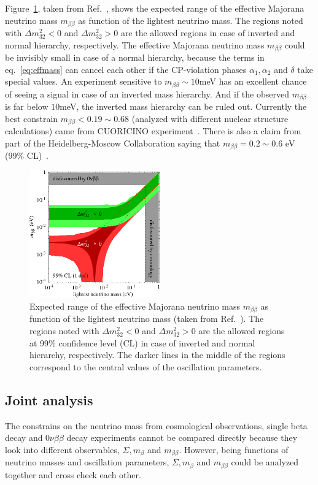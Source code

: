 Figure~\ref{fig:m2bVSlightest}, taken from Ref.~\cite{Str05}, shows the expected range of the effective Majorana neutrino mass $m_{\beta\beta}$ as function of the lightest neutrino mass. The regions noted with $\Delta m^{2}_{32}<0$ and $\Delta m^{2}_{32}>0$ are the allowed regions in case of inverted and normal hierarchy, respectively. The effective Majorana neutrino mass $m_{\beta\beta}$ could be invisibly small in case of a normal hierarchy, because the terms in eq.~\ref{eq:effmass} can cancel each other if the CP-violation phases $\alpha_{1}, \alpha_{2}$ and $\delta$ take special values. An experiment sensitive to $ m_{\beta\beta} \sim 10$meV has an excellent chance of seeing a signal in case of an inverted mass hierarchy. And if the observed $m_{\beta\beta}$ is far below $10$meV, the inverted mass hierarchy can be ruled out. Currently the best constrain $m_{\beta\beta}<0.19 \sim 0.68$ (analyzed with different nuclear structure calculations) came from CUORICINO experiment~\cite{Cuo08}. There is also a claim from part of the Heidelberg-Moscow Collaboration saying that $m_{\beta\beta} = 0.2 \sim 0.6$ eV (99\% CL)~\cite{Hei04}.
\begin{figure}[tbhp]
  \centering
  \includegraphics[width=0.5\textwidth]{m2bVSlightest.eps}  
  \caption{Expected range of the effective Majorana neutrino mass     $m_{\beta\beta}$ as function of the lightest neutrino mass (taken     from Ref.~\cite{Str05}). The regions noted with $\Delta     m^{2}_{32}<0$ and $\Delta m^{2}_{32}>0$ are the allowed regions at     99\% confidence level (CL) in case of inverted and normal     hierarchy, respectively. The darker lines in the middle of the     regions correspond to the central values of the oscillation     parameters.}
  \label{fig:m2bVSlightest}
\end{figure}

\subsection{Joint analysis}
\label{sec:joian}
The constrains on the neutrino mass from cosmological observations, single beta decay and $0\nu\beta\beta$ decay experiments cannot be compared directly because they look into different observables, $\Sigma, m_{\beta}$ and $m_{\beta\beta}$. However, being functions of neutrino masses and oscillation parameters, $\Sigma, m_{\beta}$ and $m_{\beta\beta}$ could be analyzed together and cross check each other. 

